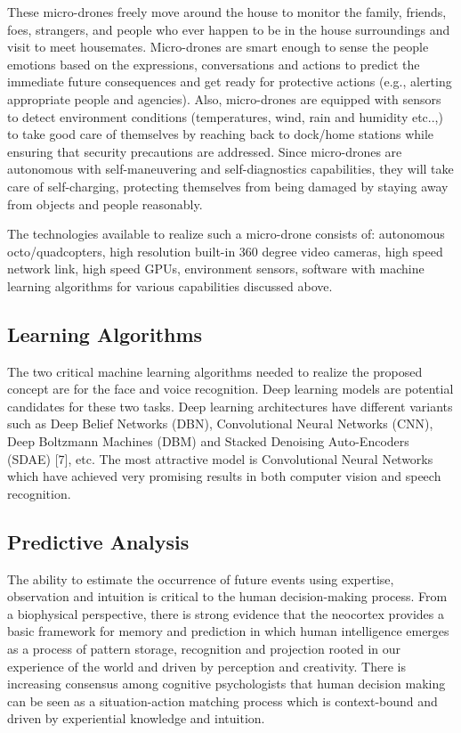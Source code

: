 \documentclass[sigconf]{acmart}
\begin{document}
These micro-drones freely move around the house to monitor the family, friends, foes, strangers, and people who ever happen to be in the house surroundings and visit to meet housemates. Micro-drones are smart enough to sense the people emotions based on the expressions, conversations and actions to predict the immediate future consequences and get ready for protective actions (e.g., alerting appropriate people and agencies). Also, micro-drones are equipped with sensors to detect environment conditions (temperatures, wind, rain and humidity etc..,) to take good care of themselves by reaching back to dock/home stations while ensuring that security precautions are addressed. 
Since micro-drones are autonomous with self-maneuvering and self-diagnostics capabilities, they will take care of self-charging, protecting themselves from being damaged by staying away from objects and people reasonably.

The technologies available to realize such a micro-drone consists of: autonomous octo/quadcopters, high resolution built-in 360 degree video cameras, high speed network link, high speed GPUs, environment sensors, software with machine learning algorithms for various capabilities discussed above.

\subsection{Learning Algorithms}
The two critical machine learning algorithms needed to realize the proposed concept are for the face and voice recognition. Deep learning models are potential candidates for these two tasks. Deep learning architectures have different variants such as Deep Belief Networks (DBN)\cite{Hinton2009}, Convolutional Neural Networks (CNN)\cite{NIPS2012_4824}, Deep Boltzmann Machines (DBM)\cite{pmlr-v9-salakhutdinov10a} and Stacked Denoising Auto-Encoders (SDAE) [7], etc. The most attractive model is Convolutional Neural Networks which have achieved very promising results in both computer vision and speech recognition.

\subsection{Predictive Analysis }
The ability to estimate the occurrence of future events using expertise, observation and intuition is critical to the human decision-making process. From a biophysical perspective, there is strong evidence that the neocortex provides a basic framework for memory and prediction in which human intelligence emerges as a process of pattern storage, recognition and projection rooted in our experience of the world and driven by perception and creativity. There is increasing consensus among cognitive psychologists that human decision making can be seen as a situation-action matching process which is context-bound and driven by experiential knowledge and intuition.
\end{document}
